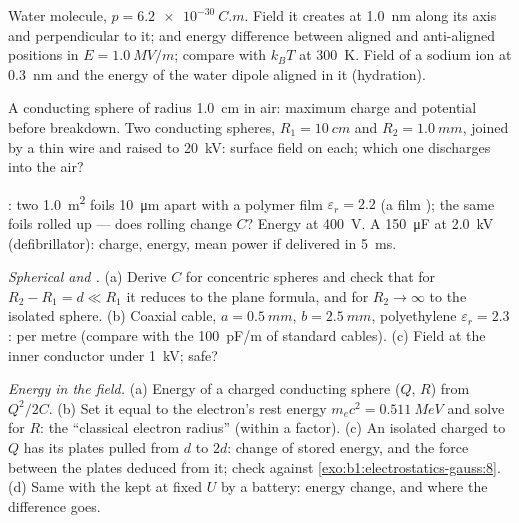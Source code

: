 \begin{exercise}[$\star\star$]\label{exo:b1:potential-capacitors:7}
Water molecule, $p = \qty{6.2e-30}{C.m}$. Field it creates at \qty{1.0}{nm}
along its axis and perpendicular to it;  and energy difference
between aligned and anti-aligned positions in $E = \qty{1.0}{MV/m}$;
compare with $k_BT$ at \qty{300}{K}. Field of a sodium ion at
\qty{0.3}{nm} and the energy of the water dipole aligned in it (hydration).
\end{exercise}

\begin{exercise}[$\star\star$]\label{exo:b1:potential-capacitors:8}
A conducting sphere of radius \qty{1.0}{cm} in air: maximum charge and
potential before breakdown. Two conducting spheres, $R_1 = \qty{10}{cm}$
and $R_2 = \qty{1.0}{mm}$, joined by a thin wire and raised to
\qty{20}{kV}: surface field on each; which one discharges into the air?
\end{exercise}

\begin{exercise}[$\star\star$]\label{exo:b1:potential-capacitors:9}
: two \qty{1.0}{m^2} foils \qty{10}{\micro m} apart with a
polymer film $\varepsilon_r = 2.2$ (a film ); the same foils rolled
up --- does rolling change $C$? Energy at \qty{400}{V}. A \qty{150}{\micro F}
 at \qty{2.0}{kV} (defibrillator): charge, energy, mean power if
delivered in \qty{5}{ms}.
\end{exercise}

\begin{exercise}[$\star\star\star$]\label{exo:b1:potential-capacitors:10}
\emph{Spherical and .} (a) Derive $C$ for
concentric spheres and check that for $R_2 - R_1 = d \ll R_1$ it reduces
to the plane formula, and for $R_2 \to \infty$ to the isolated sphere.
(b) Coaxial cable, $a = \qty{0.5}{mm}$, $b = \qty{2.5}{mm}$, polyethylene
$\varepsilon_r = 2.3$:  per metre (compare with the \qty{100}{pF/m}
of standard cables). (c) Field at the inner conductor under
\qty{1}{kV}; safe?
\end{exercise}

\begin{exercise}[$\star\star\star$]\label{exo:b1:potential-capacitors:11}
\emph{Energy in the field.} (a) Energy of a charged conducting sphere
($Q$, $R$) from $Q^2/2C$. (b) Set it equal to the electron's rest energy
$m_ec^2 = \qty{0.511}{MeV}$ and solve for $R$: the ``classical electron
radius'' (within a factor). (c) An isolated  charged to
$Q$ has its plates pulled from $d$ to $2d$: change of stored energy, and
the force between the plates deduced from it; check against
\cref{exo:b1:electrostatics-gauss:8}. (d) Same with the  kept
at fixed $U$ by a battery: energy change, and where the difference goes.
\end{exercise}

